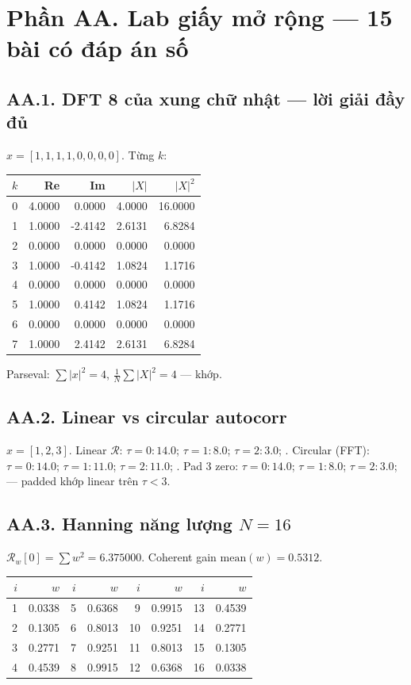 \newpage\section*{Phần AA. Lab giấy mở rộng --- 15 bài có đáp án số}
\subsection*{AA.1. DFT 8 của xung chữ nhật --- lời giải đầy đủ}
$x=[1,1,1,1,0,0,0,0]$. Từng $k$:
\begin{center}\small\begin{tabular}{@{}rrrrr@{}}
\toprule $k$ & Re & Im & $|X|$ & $|X|^2$ \\ \midrule
0 & 4.0000 & 0.0000 & 4.0000 & 16.0000 \\
1 & 1.0000 & -2.4142 & 2.6131 & 6.8284 \\
2 & 0.0000 & 0.0000 & 0.0000 & 0.0000 \\
3 & 1.0000 & -0.4142 & 1.0824 & 1.1716 \\
4 & 0.0000 & 0.0000 & 0.0000 & 0.0000 \\
5 & 1.0000 & 0.4142 & 1.0824 & 1.1716 \\
6 & 0.0000 & 0.0000 & 0.0000 & 0.0000 \\
7 & 1.0000 & 2.4142 & 2.6131 & 6.8284 \\
\bottomrule\end{tabular}\end{center}
Parseval: $\sum|x|^2=4$, $\frac1N\sum|X|^2=4$ --- khớp.
\subsection*{AA.2. Linear vs circular autocorr}
$x=[1,2,3]$. Linear $\mathcal{R}$: 
$\tau=0: 14.0$; 
$\tau=1: 8.0$; 
$\tau=2: 3.0$; 
. Circular (FFT): 
$\tau=0: 14.0$; 
$\tau=1: 11.0$; 
$\tau=2: 11.0$; 
. Pad 3 zero: 
$\tau=0: 14.0$; 
$\tau=1: 8.0$; 
$\tau=2: 3.0$; 
 --- padded khớp linear trên $\tau<3$.
\subsection*{AA.3. Hanning năng lượng $N=16$}
$\mathcal{R}_w[0]=\sum w^2=6.375000$. Coherent gain $\mathrm{mean}(w)=0.5312$.
\begin{center}\scriptsize\begin{tabular}{@{}rrrrrrrr@{}}
\toprule $i$ & $w$ & $i$ & $w$ & $i$ & $w$ & $i$ & $w$ \\ \midrule
1 & 0.0338 & 5 & 0.6368 & 9 & 0.9915 & 13 & 0.4539 \\
2 & 0.1305 & 6 & 0.8013 & 10 & 0.9251 & 14 & 0.2771 \\
3 & 0.2771 & 7 & 0.9251 & 11 & 0.8013 & 15 & 0.1305 \\
4 & 0.4539 & 8 & 0.9915 & 12 & 0.6368 & 16 & 0.0338 \\
\bottomrule\end{tabular}\end{center}
